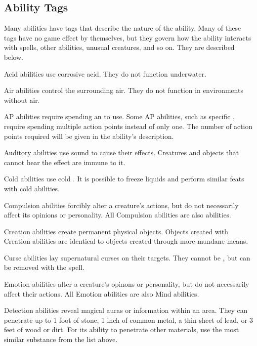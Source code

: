    \subsection{Ability Tags}\label{Ability Tags}

        Many abilities have tags that describe the nature of the ability.
        Many of these tags have no game effect by themselves, but they govern how the ability interacts with spells, other abilities, unusual creatures, and so on.
        They are described below.

         Acid abilities use corrosive acid.
        They do not function underwater.

         Air abilities control the surrounding air.
        They do not function in environments without air.

         AP abilities require spending an  to use.
        Some AP abilities, such as specific , require spending multiple action points instead of only one.
        The number of action points required will be given in the ability's description.

         Auditory abilities use sound to cause their effects.
        Creatures and objects that cannot hear the effect are immune to it.

         Cold abilities use cold . It is possible to freeze liquids and perform similar feats with cold abilities.

         Compulsion abilities forcibly alter a creature's actions, but do not necessarily affect its opinions or personality.
        All Compulsion abilities are also  abilities.

         Creation abilities create permanent physical objects.
        Objects created with Creation abilities are identical to objects created through more mundane means.

         Curse abilities lay supernatural curses on their targets.
        They cannot be , but can be removed with the  spell.

         Emotion abilities alter a creature's opinons or personality, but do not necessarily affect their actions.
        All Emotion abilities are also Mind abilities.

         Detection abilities reveal magical auras or information within an area.
        They can penetrate up to 1 foot of stone, 1 inch of common metal, a thin sheet of lead, or 3 feet of wood or dirt.
        For its ability to penetrate other materials, use the most similar substance from the list above.

